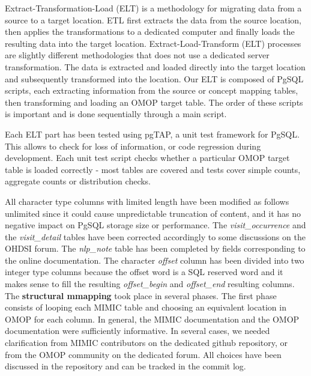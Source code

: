 Extract-Transformation-Load (ELT) is a methodology for migrating data from a 
source to a target location. ETL first extracts the data from the source location, 
then applies the transformations to a dedicated computer and finally loads the 
resulting data into the target location. Extract-Load-Transform (ELT) processes 
are slightly different methodologies that does not use a dedicated server 
transformation. The data is extracted and loaded directly into the target location 
and subsequently transformed into the location.
Our ELT is composed of PgSQL scripts, each extracting information from the source 
or concept mapping tables, then transforming and loading an OMOP target table. 
The order of these scripts is important and is done sequentially through a main 
script.

Each ELT part has been tested using pgTAP, a unit test framework for PgSQL.
This allows to check for loss of information, or code regression during
development. Each unit test script checks whether a particular OMOP target
table is loaded correctly - most tables are covered and tests cover simple
counts, aggregate counts or distribution checks.

All character type columns with limited length have been modified as follows
unlimited since it could cause unpredictable truncation of content, and it has
no negative impact on PgSQL storage size or performance. The
\textit{visit\_occurrence} and the \textit{visit\_detail} tables have been
corrected accordingly to some discussions on the OHDSI forum. 
The \textit{nlp\_note} table has been completed by fields corresponding to 
the online documentation. The character \textit{offset} column has been divided into two 
integer type columns because the offset word is a SQL reserved word and it makes 
sense to fill the resulting \textit{offset\_begin} and \textit{offset\_end} 
resulting columns.
\\

The \textbf{structural mmapping} took place in several phases.
The first phase consists of looping each MIMIC table and choosing an equivalent 
location in OMOP for each column. In general, the MIMIC documentation and the OMOP 
documentation were sufficiently informative. In several cases, we needed 
clarification from MIMIC contributors on the dedicated github repository, or from 
the OMOP community on the dedicated forum. All choices have been discussed in the 
repository \cite{mimic-omop-github} and can be tracked in the commit log.

